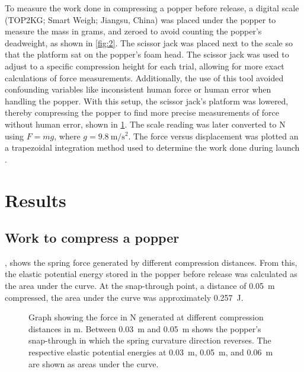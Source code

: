 \documentclass[reprint,amsmath,amssymb,aps,twoside]{revtex4-2} %
\begin{document}
To measure the work done in compressing a popper before release, a digital scale (TOP2KG; Smart Weigh; Jiangsu, China) was placed under the popper to measure the mass in grams, and zeroed to avoid counting the popper's deadweight, as shown in \cref{fig:2}. The scissor jack was placed next to the scale so that the platform sat on the popper's foam head. The scissor jack was used to adjust to a specific compression height for each trial, allowing for more exact calculations of force measurements. Additionally, the use of this tool avoided confounding variables like inconsistent human force or human error when handling the popper. With this setup, the scissor jack's platform was lowered, thereby compressing the popper to find more precise measurements of force without human error, shown in \cref{fig:3}. The scale reading was later converted to \unit{\newton} using $F=mg$, where $g=\qty{9.8}{\meter\per\second\squared}$. The force versus displacement was plotted an a trapezoidal integration method used to determine the work done during launch \cite{R,ggplot2,dplyr}. 







        
\section{Results}
\subsection{Work to compress a popper}
, shows the spring force generated by different compression distances. From this, the elastic potential energy stored in the popper before release was calculated as the area under the curve. At the snap-through point, a distance of \qty{0.05}{\meter} compressed, the area under the curve was approximately \qty{0.257}{\joule}.
\begin{figure}
\begin{center}

\end{center}
\caption{Graph showing the force in \unit{\newton} generated at different compression distances in \unit{\meter}. Between \qty{0.03}{\meter} and \qty{0.05}{\meter} shows the popper’s snap-through in which the spring curvature direction reverses. The respective elastic potential energies at \qty{0.03}{\meter}, \qty{0.05}{\meter}, and \qty{0.06}{\meter} are shown as areas under the curve.}
\label{fig:3}
\end{figure}
\end{document}
